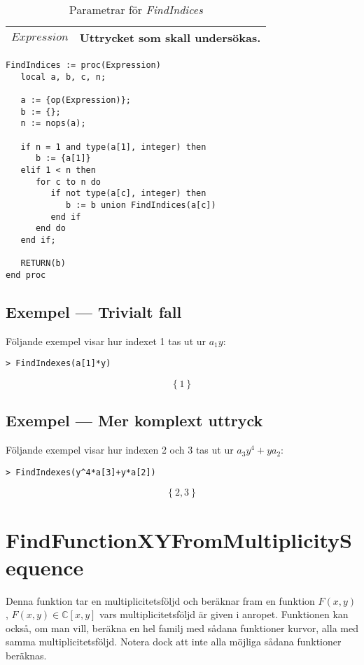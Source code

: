\begin{table}[h]
\caption{Parametrar för \emph{FindIndices}}
\begin{center}
\begin{tabular}{|l|p{9cm}|}
\hline
$Expression$ & Uttrycket som skall undersökas. \\
\hline
\end{tabular}
\end{center}
\end{table}

\begin{verbatim}
FindIndices := proc(Expression)
   local a, b, c, n;

   a := {op(Expression)};
   b := {};
   n := nops(a);

   if n = 1 and type(a[1], integer) then
      b := {a[1]}
   elif 1 < n then
      for c to n do
         if not type(a[c], integer) then
            b := b union FindIndices(a[c])
         end if
      end do
   end if;

   RETURN(b)
end proc
\end{verbatim}

\subsection{Exempel --- Trivialt fall}

Följande exempel visar hur indexet 1 tas ut ur $a_1y$:

\begin{verbatim}
> FindIndexes(a[1]*y)
\end{verbatim}
\[\left\{1\right\}\]

\subsection{Exempel --- Mer komplext uttryck}

Följande exempel visar hur indexen 2 och 3 tas ut ur $a_3y^4+ya_2$:

\begin{verbatim}
> FindIndexes(y^4*a[3]+y*a[2])
\end{verbatim}
\[\left\{2,3\right\}\]

\section{FindFunctionXYFromMultiplicitySequence}
\label{FindFunctionXYFromMultiplicitySequence}

Denna funktion tar en multiplicitetsföljd och beräknar fram en funktion $F(x,y)$, $F(x, y) \in \mathbb{C}\left[x, y\right]$ vars multiplicitetsföljd är given i anropet. Funktionen kan också, om man vill, beräkna en hel familj med sådana funktioner kurvor, alla med samma multiplicitetsföljd. Notera dock att inte alla möjliga sådana funktioner beräknas.

